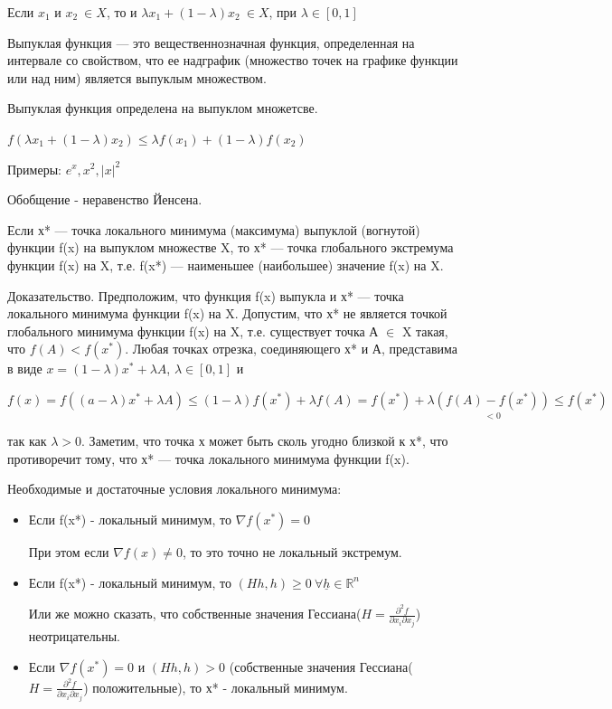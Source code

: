 \documentclass[a4paper, 12pt]{article}
\begin{document}
	Если $x_1$ и $x_2 \: \in X$, то и $\lambda x_1 + (1-\lambda)x_2 \: \in X$, при $\lambda \in [0, 1]$
	
	Выпуклая функция — это вещественнозначная функция, определенная на интервале со свойством, что ее надграфик (множество точек на графике функции или над ним) является выпуклым множеством.
	
	Выпуклая функция определена на выпуклом множетсве.
	
	$f(\lambda x_1 + (1-\lambda)x_2) \leq \lambda f(x_1) +(1-\lambda) f(x_2)$
	
	Примеры: $e^x, x^2, |x|^2$
	
	Обобщение - неравенство Йенсена.
	
	
	Если х* — точка локального минимума (максимума) выпуклой (вогнутой) функции f(x) на выпуклом множестве X, то х* — точка глобального экстремума функции f(x) на X, т.е. f(x*) — наименьшее (наибольшее) значение f(x) на X.
	
	Доказательство. Предположим, что функция f(x) выпукла и х* — точка локального минимума функции f(x) на X. Допустим, что х* не является точкой глобального минимума функции f(x) на X, т.е. существует точка А $\in$ X такая, что $f(A) < f(x^*)$. Любая точках отрезка, соединяющего х* и А, представима в виде $x = (1 - \lambda)x^* + \lambda A$, $\lambda \in [0, 1]$ и 
	
	$f(x) = f((a-\lambda)x^*+\lambda A)\leq (1-\lambda) f(x^*) + \lambda f(A) = f(x^*) + \lambda \underset{<0}{(f(A) -f(x^*))} \leq f(x^*)$
	
	так как $\lambda > 0$. Заметим, что точка х может быть сколь угодно близкой к х*, что противоречит тому, что х* — точка локального минимума функции f(x).
	
	Необходимые и достаточные условия локального минимума:
	
	\begin{itemize}
		\item Если f(x*) - локальный минимум, то $\nabla f(x^*) = 0$
		
		При этом если $\nabla f(x) \neq 0$, то это точно не локальный экстремум.
		
		\item  Если f(x*) - локальный минимум, то $(Hh, h) \geq 0 \: \forall \underline{h} \in \mathbb {R}^{n}$
		
		Или же можно сказать, что собственные значения Гессиана($H = \frac{\partial^2 f}{\partial x_i \partial x_j}$) неотрицательны. 
		
		\item Если $\nabla f(x^*) = 0$ и $(Hh, h) > 0$ (собственные значения Гессиана($H = \frac{\partial^2 f}{\partial x_i \partial x_j}$) положительные), то х* - локальный минимум.
		
	\end{itemize}
	
\end{document}
